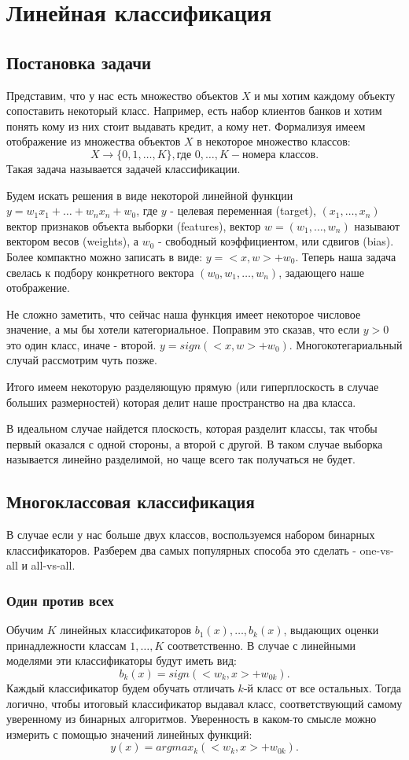 \section{Линейная классификация}
\subsection{Постановка задачи}
Представим, что у нас есть множество объектов $X$ и мы хотим каждому объекту сопоставить некоторый класс. Например, есть набор клиентов банков и хотим понять кому из них стоит выдавать кредит, а кому нет. Формализуя имеем отображение из множества объектов $X$ в некоторое множество классов: $$X \rightarrow \{0, 1, \ldots, K\}, \text{где } 0, \ldots, K - \text{номера классов}.$$
Такая задача называется задачей классификации.

Будем искать решения в виде некоторой линейной функции $y = w_1x_1 + \ldots + w_nx_n + w_0$, где $y$ - целевая переменная (target), $(x_1, \ldots, x_n)$ вектор признаков объекта выборки (features), вектор $w = (w_1, \ldots, w_n)$ называют вектором весов (weights), а $w_0$ - свободный коэффициентом, или сдвигов (bias). Более компактно можно записать в виде: $y = <x, w> + w_0$. Теперь наша задача свелась к подбору конкретного вектора $(w_0, w_1, \ldots, w_n)$, задающего наше отображение. 

Не сложно заметить, что сейчас наша функция имеет некоторое числовое значение, а мы бы хотели категориальное. Поправим это сказав, что если $y > 0$ это один класс, иначе - второй. $y = sign (<x, w> + w_0)$. Многокотегариальный случай рассмотрим чуть позже.

Итого имеем некоторую разделяющую прямую (или гиперплоскость в случае больших размерностей) которая делит наше пространство на два класса.

В идеальном случае найдется плоскость, которая разделит классы, так чтобы первый оказался с одной стороны, а второй с другой. В таком случае выборка называется линейно разделимой, но чаще всего так получаться не будет.

\subsection{Многоклассовая классификация}
В случае если у нас больше двух классов, воспользуемся набором бинарных классификаторов. Разберем два самых популярных способа это сделать - one-vs-all и all-vs-all.
\subsubsection*{Один против всех}
Обучим $K$ линейных классификаторов $b_1(x), \ldots, b_k(x)$, выдающих оценки принадлежности классам $1, \ldots, K$ соответственно. В случае с линейными моделями эти классификаторы будут иметь вид:
$$b_k(x) = sign(<w_k, x> + w_{0k}).$$
Каждый классификатор будем обучать отличать $k$-й класс от все остальных. Тогда логично, чтобы итоговый классификатор выдавал класс, соответствующий самому уверенному из бинарных алгоритмов. Уверенность в каком-то смысле можно измерить с помощью значений линейных функций:
$$y(x) = argmax_k(<w_k, x> + w_{0k}).$$
